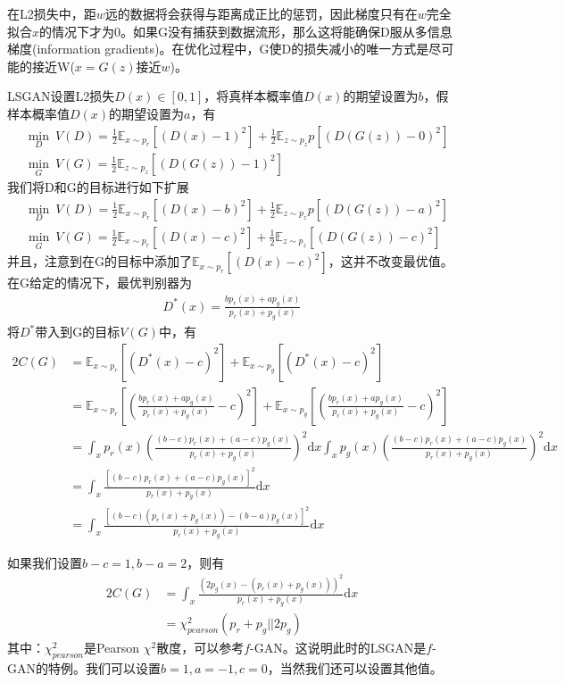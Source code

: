             在L2损失中，距$w$远的数据将会获得与距离成正比的惩罚，因此梯度只有在$w$完全拟合$x$的情况下才为0。如果G没有捕获到数据流形，那么这将能确保D服从多信息梯度(information gradients)。在优化过程中，G使D的损失减小的唯一方式是尽可能的接近W($x = G(z)$接近$w$)。
            \par
            LSGAN设置L2损失$D(x)\in [0,1]$，将真样本概率值$D(x)$的期望设置为$b$，假样本概率值$D(x)$的期望设置为$a$，有
            \begin{align*}
            & \min_D \ V(D) = \frac{1}{2} \mathbb{E}_{x\sim p_r}[(D(x) - 1)^2] + \frac{1}{2}\mathbb{E}_{z\sim p_z}p[(D(G(z))-0)^2]\\
            & \min_G \ V(G) = \frac 12 \mathbb{E}_{z\sim p_z}[(D(G(z))-1)^2]
            \end{align*}
            我们将D和G的目标进行如下扩展
            \begin{align*}
            & \min_D \ V(D) = \frac{1}{2} \mathbb{E}_{x\sim p_r}[(D(x) - b)^2] + \frac{1}{2}\mathbb{E}_{z\sim p_z}p[(D(G(z))-a)^2]\\
            & \min_G \ V(G) = \frac{1}{2} \mathbb{E}_{x\sim p_r}[(D(x) - c)^2] + \frac 12 \mathbb{E}_{z\sim p_z}[(D(G(z))-c)^2]
            \end{align*}
            并且，注意到在G的目标中添加了$\mathbb{E}_{x\sim p_r}[(D(x) - c)^2]$，这并不改变最优值。在G给定的情况下，最优判别器为
            \begin{align*}
            D^*(x) = \frac{bp_r(x)+ap_g(x)}{p_r(x)+p_g(x)}
            \end{align*}
            将$D^*$带入到G的目标$V(G)$中，有
            \begin{align*}
            2C(G) &= \mathbb{E}_{x\sim p_r}[(D^*(x)-c)^2]+\mathbb{E}_{x\sim p_g}[(D^*(x)-c)^2]\\
            &=\mathbb{E}_{x\sim p_r} \left [\left( \frac{bp_r(x)+ap_g(x)}{p_r(x)+p_g(x)} - c \right)^2  \right] + \mathbb{E}_{x\sim p_g}\left [\left( \frac{bp_r(x)+ap_g(x)}{p_r(x)+p_g(x)} - c \right)^2  \right] \\
            & =\int_x p_r(x) \left( \frac{(b-c)p_r(x)+(a-c)p_g(x)}{p_r(x)+p_g(x)} \right)^2\mathrm{d}x \int_x p_g(x) \left( \frac{(b-c)p_r(x)+(a-c)p_g(x)}{p_r(x)+p_g(x)} \right)^2\mathrm{d}x \\
            &=\int_x \frac{[(b-c)p_r(x)+(a-c)p_g(x)]^2}{p_r(x)+p_g(x)} \mathrm{d}x\\
            &=\int_x \frac{[(b-c)(p_r(x)+p_g(x))-(b-a)p_g(x)]^2}{p_r(x)+p_g(x)}\mathrm{d}x
            \end{align*}
            \par
            如果我们设置$b-c =1,b-a=2$，则有
            \begin{align*}
            2C(G) & = \int_x \frac{\left( 2p_g(x)-(p_r(x)+p_g(x)) \right)^2  }{p_r(x)+p_g(x)}\mathrm{d}x\\
            & = \chi^2_{pearson}(p_r+p_g||2p_g)
            \end{align*}
            其中：$ \chi^2_{pearson}$是Pearson $\chi^2$散度，可以参考$f$-GAN。这说明此时的LSGAN是$f$-GAN的特例。我们可以设置$b=1,a=-1,c=0$，当然我们还可以设置其他值。

